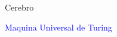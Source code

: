 \documentclass[10pt,xcolor={dvipsnames}]{beamer}
\begin{document}
\begin{frame}{Cerebro}
\begin{center}
\end{center}
\end{frame}

\begin{frame}
\begin{center}
\Huge{\textcolor{blue}{Maquina Universal de Turing}}
\end{center}
\end{frame}
\end{document}
